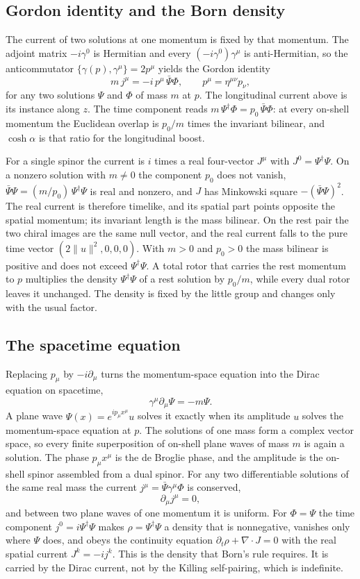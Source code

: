 \documentclass[a4paper]{article}
\begin{document}
\subsection{Gordon identity and the Born density}

The current of two solutions at one momentum is fixed by that momentum. The adjoint matrix $-i\gamma^0$ is Hermitian and every $(-i\gamma^0)\gamma^\mu$ is anti-Hermitian, so the anticommutator $\{\gamma(p),\gamma^\mu\}=2p^\mu$ yields the Gordon identity
\[
m\,j^\mu=-i\,p^\mu\,\bar\Psi\Phi,\qquad p^\mu=\eta^{\mu\nu}p_\nu,
\]
for any two solutions $\Psi$ and $\Phi$ of mass $m$ at $p$. The longitudinal current above is its instance along $z$. The time component reads $m\,\Psi^\dagger\Phi=p_0\,\bar\Psi\Phi$: at every on-shell momentum the Euclidean overlap is $p_0/m$ times the invariant bilinear, and $\cosh\alpha$ is that ratio for the longitudinal boost.

For a single spinor the current is $i$ times a real four-vector $J^\mu$ with $J^0=\Psi^\dagger\Psi$. On a nonzero solution with $m\neq 0$ the component $p_0$ does not vanish, $\bar\Psi\Psi=(m/p_0)\,\Psi^\dagger\Psi$ is real and nonzero, and $J$ has Minkowski square $-(\bar\Psi\Psi)^2$. The real current is therefore timelike, and its spatial part points opposite the spatial momentum; its invariant length is the mass bilinear. On the rest pair the two chiral images are the same null vector, and the real current falls to the pure time vector $(2\lVert u\rVert^2,0,0,0)$. With $m>0$ and $p_0>0$ the mass bilinear is positive and does not exceed $\Psi^\dagger\Psi$. A total rotor that carries the rest momentum to $p$ multiplies the density $\Psi^\dagger\Psi$ of a rest solution by $p_0/m$, while every dual rotor leaves it unchanged. The density is fixed by the little group and changes only with the usual factor.

\subsection{The spacetime equation}

Replacing $p_\mu$ by $-i\partial_\mu$ turns the momentum-space equation into the Dirac equation on spacetime,
\[
\gamma^\mu\partial_\mu\Psi=-m\Psi.
\]
A plane wave $\Psi(x)=e^{ip_\mu x^\mu}u$ solves it exactly when its amplitude $u$ solves the momentum-space equation at $p$. The solutions of one mass form a complex vector space, so every finite superposition of on-shell plane waves of mass $m$ is again a solution. The phase $p_\mu x^\mu$ is the de Broglie phase, and the amplitude is the on-shell spinor assembled from a dual spinor. For any two differentiable solutions of the same real mass the current $j^\mu=\bar\Psi\gamma^\mu\Phi$ is conserved,
\[
\partial_\mu j^\mu=0,
\]
and between two plane waves of one momentum it is uniform. For $\Phi=\Psi$ the time component $j^0=i\Psi^\dagger\Psi$ makes $\rho=\Psi^\dagger\Psi$ a density that is nonnegative, vanishes only where $\Psi$ does, and obeys the continuity equation $\partial_t\rho+\nabla\cdot J=0$ with the real spatial current $J^k=-ij^k$. This is the density that Born's rule requires. It is carried by the Dirac current, not by the Killing self-pairing, which is indefinite.
\end{document}
